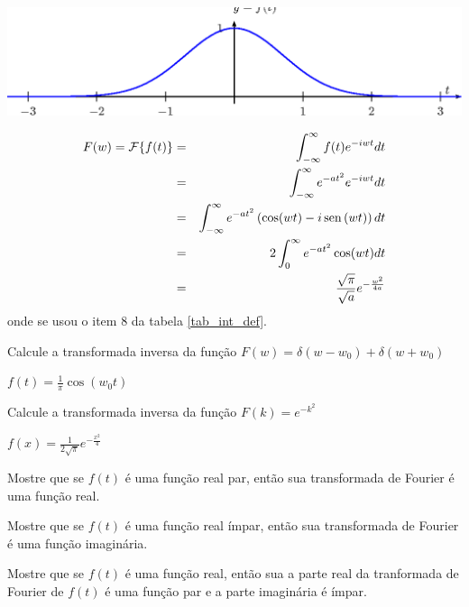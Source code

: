 \begin{Answer}
\begin{center}
\includegraphics{cap_transformada_de_fourier/pics/figura_9}\end{center}
\begin{eqnarray*}
F(w)=\mathcal{F}\{f(t)\}&=&\int_{-\infty}^\infty f(t) e^{-i w t}dt\\
&=&\int_{-\infty}^\infty e^{-at^2} e^{-i w t}dt\\
&=&\int_{-\infty}^\infty e^{-at^2} \left(\cos(wt)-i\operatorname{sen}\,(wt)\right)dt\\
&=&2\int_{0}^\infty e^{-at^2} \cos(wt)dt\\
&=&\frac{\sqrt{\pi}}{\sqrt{a}}e^{-\frac{w^2}{4a}}
\end{eqnarray*}
onde se usou o item 8 da tabela \ref{tab_int_def}.
\end{Answer}
\begin{Exercise} {\label{ex_trans_Fou_0}}Calcule a transformada inversa da função $F(w)=\delta(w-w_0)+\delta(w+w_0)$
\end{Exercise}
\begin{Answer} $f(t)=\frac{1}{\pi}\cos(w_0t)$
\end{Answer}
\begin{Exercise}{\label{ex_inv_exp_kk}} Calcule a transformada inversa da função $F(k)=e^{-k^2}$
\end{Exercise}
\begin{Answer} $f(x)=\frac{1}{2\sqrt{\pi}} e^{-\frac{x^2}{4}}$
\end{Answer}
\begin{Exercise} Mostre que se $f(t)$ é uma função real par, então sua transformada de Fourier é uma função real.
\end{Exercise}
\begin{Exercise} Mostre que se $f(t)$ é uma função real ímpar, então sua transformada de Fourier é uma função imaginária.
\end{Exercise}
\begin{Exercise} Mostre que se $f(t)$ é uma função real, então sua a parte real da tranformada de Fourier de $f(t)$ é uma função par e a parte imaginária é ímpar.
\end{Exercise}
